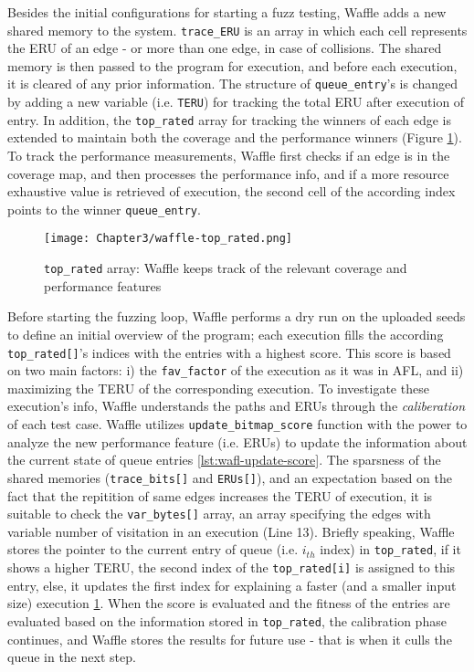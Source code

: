 Besides the initial configurations for starting a fuzz testing, Waffle adds a new shared memory to the system. \texttt{trace\_ERU} is an array in which each cell represents the ERU of an edge - or more than one edge, in case of collisions. The shared memory is then passed to the program for execution, and before each execution, it is cleared of any prior information. The structure of \texttt{queue\_entry}'s is changed by adding a new variable (i.e. \texttt{TERU}) for tracking the total ERU after execution of entry. In addition, the \texttt{top\_rated} array for tracking the winners of each edge is extended to maintain both the coverage and the performance winners (Figure \ref{fig:waffle-top_rated}). To track the performance measurements, Waffle first checks if an edge is in the coverage map, and then processes the performance info, and if a more resource exhaustive value is retrieved of execution, the second cell of the according index points to the winner \texttt{queue\_entry}. 

\begin{figure}[!b]
  \texttt{[image: Chapter3/waffle-top\_rated.png]}
  \centering
  \caption{\texttt{top\_rated} array: Waffle keeps track of the relevant coverage and performance features}
  \label{fig:waffle-top_rated}
\end{figure}


Before starting the fuzzing loop, Waffle performs a dry run on the uploaded seeds to define an initial overview of the program; each execution fills the according \texttt{top\_rated[]}'s indices with the entries with a highest score. This score is based on two main factors: i) the \texttt{fav\_factor} of the execution as it was in AFL, and ii) maximizing the TERU of the corresponding execution. To investigate these execution's info, Waffle understands the paths and ERUs through the \textit{caliberation} of each test case. Waffle utilizes \texttt{update\_bitmap\_score} function with the power to analyze the new performance feature (i.e. ERUs) to update the information about the current state of queue entries \ref{lst:wafl-update-score}. The sparsness of the shared memories (\texttt{trace\_bits[]} and \texttt{ERUs[]}), and an expectation based on the fact that the repitition of same edges increases the TERU of execution, it is suitable to check the \texttt{var\_bytes[]} array, an array specifying the edges with variable number of visitation in an execution (Line 13). Briefly speaking, Waffle stores the pointer to the current entry of queue (i.e. $i_{th}$ index) in \texttt{top\_rated}, if it shows a higher TERU, the second index of the \texttt{top\_rated[i]} is assigned to this entry, else, it updates the first index for explaining a faster (and a smaller input size) execution \ref{fig:waffle-top_rated}. When the score is evaluated and the fitness of the entries are evaluated based on the information stored in \texttt{top\_rated}, the calibration phase continues, and Waffle stores the results for future use - that is when it culls the queue in the next step.

